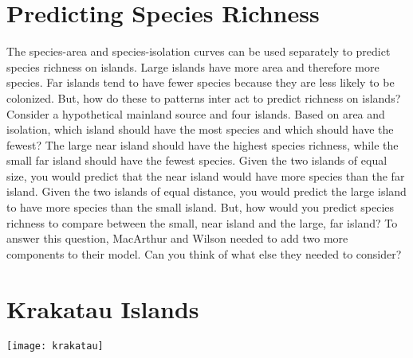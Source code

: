 \documentclass[letterpaper]{tufte-handout}
\begin{document}
\section{Predicting Species Richness}
\begin{marginfigure}%
\end{marginfigure} 

The species-area and species-isolation curves can be used separately to predict species richness on islands. Large islands have more area and therefore more species. Far islands tend to have fewer species because they are less likely to be colonized.  But, how do these to patterns inter act to predict richness on islands? 
Consider a hypothetical mainland source and four islands. Based on area and isolation, which island should have the most species and which should have the fewest? The large near island should have the highest species richness, while the small far island should have the fewest species.  Given the two islands of equal size, you would predict that the near island would have more species than the far island. Given the two islands of equal distance, you would predict the large island to have more species than the small island.  But, how would you predict species richness to compare between the small, near island and the large, far island?  To answer this question, MacArthur and Wilson needed to add two more components to their model. Can you think of what else they needed to consider?

\section{Krakatau Islands}

\begin{marginfigure}%
	\centering
	\texttt{[image: krakatau]}
\end{marginfigure} 
\end{document}
